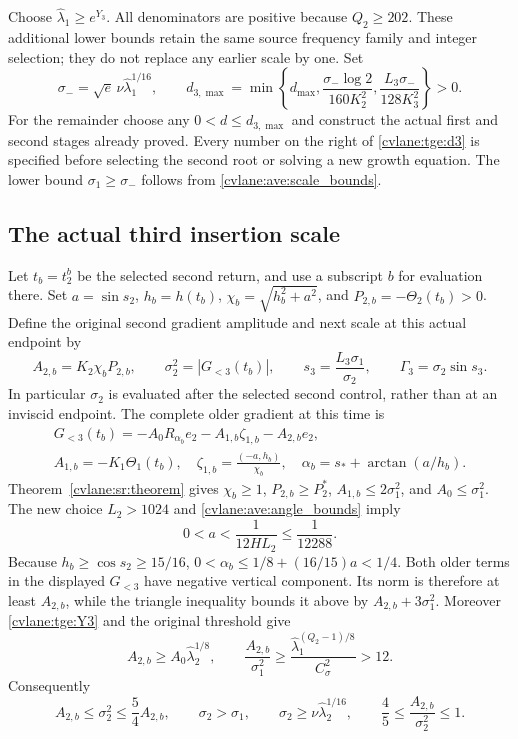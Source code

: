 Choose $\widehat\lambda_1\geq e^{Y_3}$.
All denominators are positive because $Q_2\geq202$.
These additional lower bounds retain the same source frequency family
and integer selection; they do not replace any earlier scale by one.
Set
\begin{equation}\label{cvlane:tge:d3}
 \sigma_- =\sqrt e\,\nu\widehat\lambda_1^{1/16},\qquad
 d_{3,\max}=\min\left\{d_{\max},
      \frac{\sigma_-\log2}{160K_2^2},
      \frac{L_3\sigma_-}{128K_3^2}\right\}>0.
\end{equation}
For the remainder choose any $0<d\leq d_{3,\max}$ and construct
the actual first and second stages already proved. Every number on
the right of \eqref{cvlane:tge:d3} is specified before selecting the second
root or solving a new growth equation. The lower bound
$\sigma_1\geq\sigma_-$ follows from \eqref{cvlane:ave:scale_bounds}.

\subsection{The actual third insertion scale}

Let $t_b=t_2^b$ be the selected second return, and use a subscript
$b$ for evaluation there. Set $a=\sin s_2$, $h_b=h(t_b)$,
$\chi_b=\sqrt{h_b^2+a^2}$, and $P_{2,b}=-\Theta_2(t_b)>0$.
Define the original second gradient amplitude and next scale at this
actual endpoint by
\begin{equation}\label{cvlane:tge:birthscale}
 A_{2,b}=K_2\chi_bP_{2,b},\qquad
 \sigma_2^2=|G_{<3}(t_b)|,\qquad
 s_3=\frac{L_3\sigma_1}{\sigma_2},\qquad
 \Gamma_3=\sigma_2\sin s_3.
\end{equation}
In particular $\sigma_2$ is evaluated after the selected second
control, rather than at an inviscid endpoint.
The complete older gradient at this time is
\begin{gather*}
 G_{<3}(t_b)=-A_0R_{\alpha_b}e_2
              -A_{1,b}\zeta_{1,b}-A_{2,b}e_2,\\
 A_{1,b}=-K_1\Theta_1(t_b),\quad
 \zeta_{1,b}=\frac{(-a,h_b)}{\chi_b},\quad
 \alpha_b=s_*+\arctan(a/h_b).
\end{gather*}
Theorem~\ref{cvlane:sr:theorem} gives
$\chi_b\geq1$, $P_{2,b}\geq P_2^*$,
$A_{1,b}\leq2\sigma_1^2$, and $A_0\leq\sigma_1^2$.
The new choice $L_2>1024$ and \eqref{cvlane:ave:angle_bounds} imply
\begin{equation}\label{cvlane:tge:a_small}
 0<a<\frac1{12HL_2}\leq\frac1{12288}.
\end{equation}
Because $h_b\geq\cos s_2\geq15/16$,
$0<\alpha_b\leq1/8+(16/15)a<1/4$.
Both older terms in the displayed $G_{<3}$ have negative vertical
component. Its norm is therefore at least $A_{2,b}$, while the
triangle inequality bounds it above by $A_{2,b}+3\sigma_1^2$.
Moreover \eqref{cvlane:tge:Y3} and the original threshold give
\[
 A_{2,b}\geq A_0\widehat\lambda_2^{1/8},\qquad
 \frac{A_{2,b}}{\sigma_1^2}
 \geq\frac{\widehat\lambda_1^{(Q_2-1)/8}}{C_\sigma^2}>12.
\]
Consequently
\begin{equation}\label{cvlane:tge:scale_bounds}
 A_{2,b}\leq\sigma_2^2\leq\frac54A_{2,b},\qquad
 \sigma_2>\sigma_1,\qquad
 \sigma_2\geq\nu\widehat\lambda_2^{1/16},\qquad
 \frac45\leq\frac{A_{2,b}}{\sigma_2^2}\leq1.
\end{equation}

